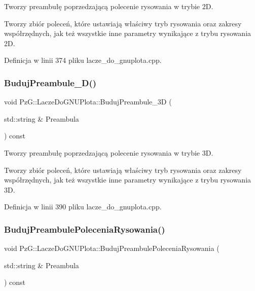 Tworzy preambułę poprzedzającą polecenie rysowania w trybie 2D. 

Tworzy zbiór poleceń, które ustawiają właściwy tryb rysowania oraz zakresy współrzędnych, jak też wszystkie inne parametry wynikające z trybu rysowania 2D. 

Definicja w linii 374 pliku lacze\+\_\+do\+\_\+gnuplota.\+cpp.

\mbox{\label{class_pz_g_1_1_lacze_do_g_n_u_plota_a50a544677e52829cac4dd4a95b821dcb}} 
\subsubsection{\texorpdfstring{Buduj\+Preambule\+\_\+D()}{BudujPreambule\_3D()}}
{\footnotesize\ttfamily void Pz\+G\+::\+Lacze\+Do\+G\+N\+U\+Plota\+::\+Buduj\+Preambule\+\_\+3D (\begin{DoxyParamCaption}\item[{std\+::string \&}]{Preambula }\end{DoxyParamCaption}) const\hspace{0.3cm}{\ttfamily [protected]}}



Tworzy preambułę poprzedzającą polecenie rysowania w trybie 3D. 

Tworzy zbiór poleceń, które ustawiają właściwy tryb rysowania oraz zakresy współrzędnych, jak też wszystkie inne parametry wynikające z trybu rysowania 3D. 

Definicja w linii 390 pliku lacze\+\_\+do\+\_\+gnuplota.\+cpp.

\mbox{\label{class_pz_g_1_1_lacze_do_g_n_u_plota_a0da98f68f533070d5a32adbdb519cf56}} 
\subsubsection{\texorpdfstring{Buduj\+Preambule\+Polecenia\+Rysowania()}{BudujPreambulePoleceniaRysowania()}}
{\footnotesize\ttfamily void Pz\+G\+::\+Lacze\+Do\+G\+N\+U\+Plota\+::\+Buduj\+Preambule\+Polecenia\+Rysowania (\begin{DoxyParamCaption}\item[{std\+::string \&}]{Preambula }\end{DoxyParamCaption}) const\hspace{0.3cm}{\ttfamily [protected]}}



